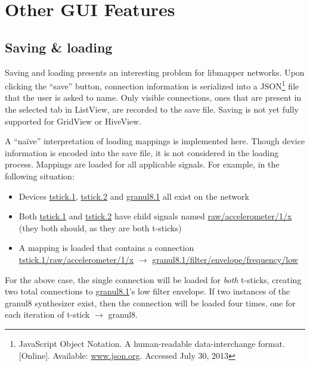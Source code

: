 

\section{Other GUI Features} %
\label{sec:other_gui_features}

	\subsection{Saving \& loading} %
	\label{sec:saving_and_loading}

Saving and loading presents an interesting problem for libmapper networks. Upon clicking the ``save'' button, connection information is serialized into a JSON\footnote{JavaScript Object Notation. A human-readable data-interchange format. [Online]. Available: \url{www.json.org}. Accessed July 30, 2013} file that the user is asked to name. Only visible connections, ones that are present in the selected tab in ListView, are recorded to the save file. Saving is not yet fully supported for GridView or HiveView.

A ``na\"{i}ve'' interpretation of loading mappings is implemented here. Though device information is encoded into the save file, it is not considered in the loading process. Mappings are loaded for all applicable signals. For example, in the following situation:

\begin{itemize}
	\item Devices \url{tstick.1}, \url{tstick.2} and \url{granul8.1} all exist on the network
	\item Both \url{tstick.1} and \url{tstick.2} have child signals named \url{raw/accelerometer/1/x} (they both should, as they are both t-sticks)
	\item A mapping is loaded that contains a connection \url{tstick.1/raw/accelerometer/1/x} $\rightarrow$ \url{granul8.1/filter/envelope/frequency/low}
\end{itemize}

For the above case, the single connection will be loaded for \emph{both} t-sticks, creating two total connections to \url{granul8.1}'s low filter envelope. If two instances of the granul8 synthesizer exist, then the connection will be loaded four times, one for each iteration of t-stick $\rightarrow$ granul8.


